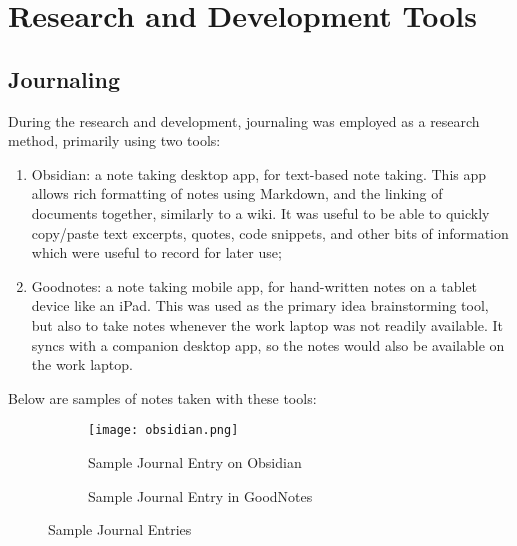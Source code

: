 \section{Research and Development Tools}


\subsection{Journaling}

During the research and development, journaling was employed as a research method, primarily using two tools:

\begin{enumerate}
    \item Obsidian\footnotemark[1]: a note taking desktop app, for text-based note taking. This app allows rich formatting of notes using Markdown, and the linking of documents together, similarly to a wiki. It was useful to be able to quickly copy/paste text excerpts, quotes, code snippets, and other bits of information which were useful to record for later use;
    \item Goodnotes\footnotemark[2]: a note taking mobile app, for hand-written notes on a tablet device like an iPad. This was used as the primary idea brainstorming tool, but also to take notes whenever the work laptop was not readily available. It syncs with a companion desktop app, so the notes would also be available on the work laptop.
\end{enumerate}

Below are samples of notes taken with these tools:


\begin{figure}[H]
  \centering
  \begin{subfigure}[b]{0.45\textwidth}
    \centering
    \texttt{[image: obsidian.png]}
    \caption[Sample Journal Entry in Obsidian]{Sample Journal Entry on Obsidian}
    \label{fig:obsidian}
  \end{subfigure}
  \hfill
  \begin{subfigure}[b]{0.45\textwidth}
    \centering
    \begingroup
    \setlength{\fboxsep}{0pt} %
    \setlength{\fboxrule}{0.5pt} %
    \endgroup
    \caption[Sample Journal Entry in GoodNotes]{Sample Journal Entry in GoodNotes}
    \label{fig:goodnotes}
  \end{subfigure}
  \caption{Sample Journal Entries}
  \label{fig:sample-journal}
\end{figure}

